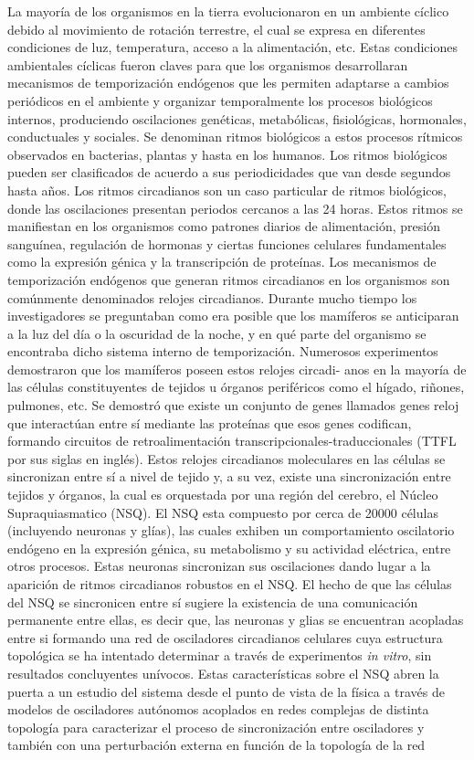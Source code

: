 \documentclass[draft.tex]{subfiles}
\begin{document}
La mayoría de los organismos en la tierra evolucionaron en un ambiente cíclico debido
al movimiento de rotación terrestre, el cual se expresa en diferentes condiciones de luz,
temperatura, acceso a la alimentación, etc. Estas condiciones ambientales cíclicas fueron
claves para que los organismos desarrollaran mecanismos de temporización endógenos que
les permiten adaptarse a cambios periódicos en el ambiente y organizar temporalmente los
procesos biológicos internos, produciendo oscilaciones genéticas, metabólicas, fisiológicas,
hormonales, conductuales y sociales. Se denominan ritmos biológicos a estos procesos
rítmicos observados en bacterias, plantas y hasta en los humanos. Los ritmos biológicos
pueden ser clasificados de acuerdo a sus periodicidades que van desde segundos hasta años.
Los ritmos circadianos son un caso particular de ritmos biológicos, donde las oscilaciones
presentan periodos cercanos a las 24 horas. Estos ritmos se manifiestan en los organismos
como patrones diarios de alimentación, presión sanguínea, regulación de hormonas y
ciertas funciones celulares fundamentales como la expresión génica y la transcripción de
proteínas. Los mecanismos de temporización endógenos que generan ritmos circadianos
en los organismos son comúnmente denominados relojes circadianos.
Durante mucho tiempo los investigadores se preguntaban como era posible que los
mamíferos se anticiparan a la luz del día o la oscuridad de la noche, y en qué parte del
organismo se encontraba dicho sistema interno de temporización.
Numerosos experimentos demostraron que los mamíferos poseen estos relojes circadi-
anos en la mayoría de las células constituyentes de tejidos u órganos periféricos como el
hígado, riñones, pulmones, etc. Se demostró que existe un conjunto de genes llamados
genes reloj que interactúan entre sí mediante las proteínas que esos genes codifican,
formando circuitos de retroalimentación transcripcionales-traduccionales (TTFL por sus
siglas en inglés). Estos relojes circadianos moleculares en las células se sincronizan entre
sí a nivel de tejido y, a su vez, existe una sincronización entre tejidos y órganos, la cual es
orquestada por una región del cerebro, el Núcleo Supraquiasmatico (NSQ). El NSQ esta
compuesto por cerca de 20000 células (incluyendo neuronas y glías), las cuales exhiben un
comportamiento oscilatorio endógeno en la expresión génica, su metabolismo y su actividad
eléctrica, entre otros procesos. Estas neuronas sincronizan sus oscilaciones dando lugar a
la aparición de ritmos circadianos robustos en el NSQ.
El hecho de que las células del NSQ se sincronicen entre sí sugiere la existencia de
una comunicación permanente entre ellas, es decir que, las neuronas y glias se encuentran
acopladas entre si formando una red de osciladores circadianos celulares cuya estructura
topológica se ha intentado determinar a través de experimentos \textit{in vitro}, sin resultados concluyentes unívocos.
Estas características sobre el NSQ abren la puerta a un estudio del sistema desde el
punto de vista de la física a través de modelos de osciladores autónomos acoplados en
redes complejas de distinta topología para caracterizar el proceso de sincronización entre
osciladores y también con una perturbación externa en función de la topología de la red
\end{document}
